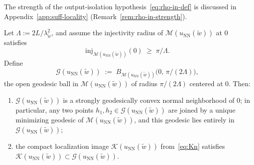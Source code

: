\documentclass[twoside,11pt]{article}
\newcommand{\NN}{\mathrm{NN}}
\newcommand{\calG}{\mathcal{G}}
\newcommand{\calK}{\mathcal{K}}
\newcommand{\calM}{\mathcal{M}}
\begin{document}
The strength of the output-isolation hypothesis~\eqref{eq:rho-in-def} is discussed in Appendix~\ref{app:suff-locality} (Remark~\ref{rem:rho-in-strength}).


\begin{lemma}\label{lem:convex-radius}
Let $\Lambda := 2L/\lambda_{\tilde w}^2$, and assume the injectivity radius of $\calM(u_\NN(\tilde w))$ at $0$ satisfies
\begin{equation}\label{eq:inj-hypothesis}
    \mathrm{inj}_{\calM(u_\NN(\tilde w))}(0) \;\ge\; \pi/\Lambda.
\end{equation}
Define
\begin{equation}\label{eq:Gdef}
    \calG(u_\NN(\tilde w)) \;:=\; B_{\calM(u_\NN(\tilde w))}\bigl(0,\,\pi/(2\Lambda)\bigr),
\end{equation}
the open geodesic ball in $\calM(u_\NN(\tilde w))$ of radius $\pi/(2\Lambda)$ centered at $0$. Then:
\begin{enumerate}[label=(\alph*),leftmargin=*,nosep]
    \item $\calG(u_\NN(\tilde w))$ is a strongly geodesically convex normal neighborhood of $0$; in particular, any two points $h_1,h_2 \in \calG(u_\NN(\tilde w))$ are joined by a unique minimizing geodesic of $\calM(u_\NN(\tilde w))$, and this geodesic lies entirely in $\calG(u_\NN(\tilde w))$;
    \item the compact localization image $\calK(u_\NN(\tilde w))$ from~\eqref{eq:Kn} satisfies $\calK(u_\NN(\tilde w)) \subset \calG(u_\NN(\tilde w))$.
\end{enumerate}
\end{lemma}
\end{document}
